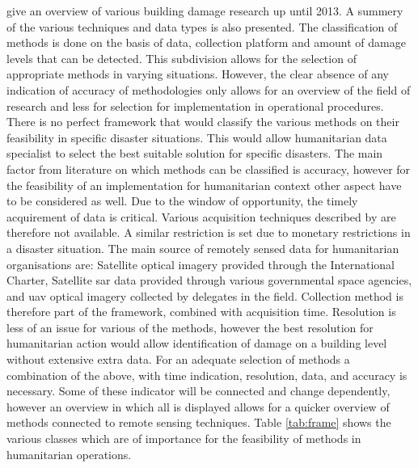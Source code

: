 \noindent \citet{Dong2013} give an overview of various building damage research up until 2013. A summery of the various techniques and data types is also presented. The classification of methods is done on the basis of data, collection platform and amount of damage levels that can be detected. This subdivision allows for the selection of appropriate methods in varying situations. However, the clear absence of any indication of accuracy of methodologies only allows for an overview of the field of research and less for selection for implementation in operational procedures. \\

\noindent There is no perfect framework that would classify the various methods on their feasibility in specific disaster situations. This would allow humanitarian data specialist to select the best suitable solution for specific disasters. The main factor from literature on which methods can be classified is accuracy, however for the feasibility of an implementation for humanitarian context other aspect have to be considered as well. Due to the window of opportunity, the timely acquirement of data is critical. Various acquisition techniques described by \citet{Kerle2008} are therefore not available. A similar restriction is set due to monetary restrictions in a disaster situation. The main source of remotely sensed data for humanitarian organisations are: Satellite optical imagery provided through the International Charter, Satellite \ac{sar} data provided through various governmental space agencies, and \ac{uav} optical imagery collected by delegates in the field. Collection method is therefore part of the framework, combined with acquisition time. Resolution is less of an issue for various of the methods, however the best resolution for humanitarian action would allow identification of damage on a building level without extensive extra data. For an adequate selection of methods a combination of the above, with time indication, resolution, data, and accuracy is necessary. Some of these indicator will be connected and change dependently, however an overview in which all is displayed allows for a quicker overview of methods connected to remote sensing techniques. Table \ref{tab:frame} shows the various classes which are of importance for the feasibility of methods in humanitarian operations.\\


